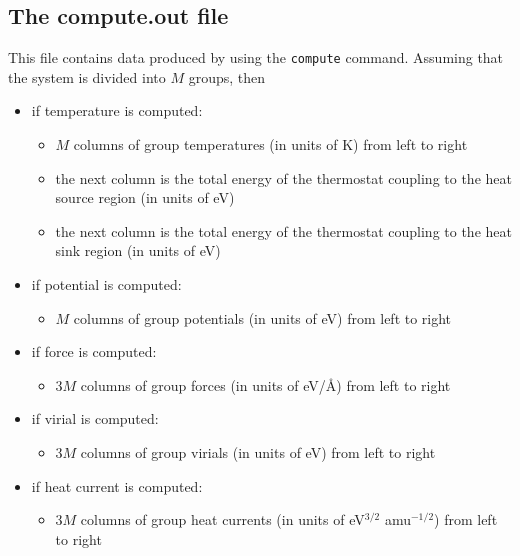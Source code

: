 \documentclass[12pt,a4paper]{report}
\begin{document}
\subsection{The compute.out file}

This file contains data produced by using the \verb"compute" command. Assuming that the system is divided into $M$ groups, then

\begin{itemize}

\item if temperature is computed:
\begin{itemize}
\item $M$ columns of group temperatures (in units of K) from left to right
\item the next column is the total energy of the thermostat coupling to the heat source region (in units of eV)
\item the next column is the total energy of the thermostat coupling to the heat sink region (in units of eV)
\end{itemize}

\item if potential is computed:
\begin{itemize}
\item $M$ columns of group potentials (in units of eV) from left to right
\end{itemize}

\item if force is computed:
\begin{itemize}
\item $3M$ columns of group forces (in units of eV/\AA) from left to right
\end{itemize}

\item if virial is computed:
\begin{itemize}
\item $3M$ columns of group virials (in units of eV) from left to right
\end{itemize}

\item if heat current is computed:
\begin{itemize}
\item $3M$ columns of group heat currents (in units of eV$^{3/2}$ amu$^{-1/2}$) from left to right
\end{itemize}

\end{itemize}
\end{document}
